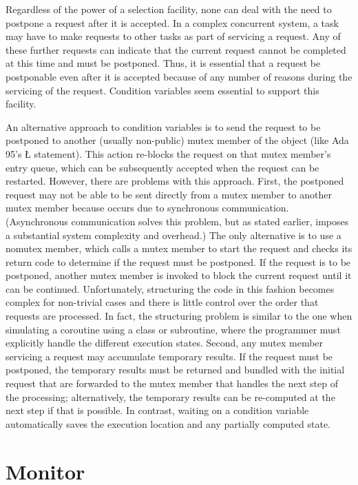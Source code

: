 \documentclass[openright,twoside]{report}
\begin{document}
Regardless of the power of a selection facility, none can deal with the need to postpone a request after it is accepted.
In a complex concurrent system, a task may have to make requests to other tasks as part of servicing a request.
Any of these further requests can indicate that the current request cannot be completed at this time and must be postponed.
Thus, it is essential that a request be postponable even after it is accepted because of any number of reasons during the servicing of the request.
Condition variables seem essential to support this facility.

An alternative approach to condition variables is to send the request to be postponed to another (usually non-public) mutex member of the object (like Ada 95's \LGinlinetrue\LGbegin\lgrinde\L{}\endlgrinde\LGend{} statement).
This action re-blocks the request on that mutex member's entry queue, which can be subsequently accepted when the request can be restarted.
However, there are problems with this approach.
First, the postponed request may not be able to be sent directly from a mutex member to another mutex member because  occurs due to synchronous communication.
(Asynchronous communication solves this problem, but as stated earlier, imposes a substantial system complexity and overhead.)
The only alternative is to use a nomutex member, which calls a mutex member to start the request and checks its return code to determine if the request must be postponed.
If the request is to be postponed, another mutex member is invoked to block the current request until it can be continued.
Unfortunately, structuring the code in this fashion becomes complex for non-trivial cases and there is little control over the order that requests are processed.
In fact, the structuring problem is similar to the one when simulating a coroutine using a class or subroutine, where the programmer must explicitly handle the different execution states.
Second, any mutex member servicing a request may accumulate temporary results.
If the request must be postponed, the temporary results must be returned and bundled with the initial request that are forwarded to the mutex member that handles the next step of the processing;
alternatively, the temporary results can be re-computed at the next step if that is possible.
In contrast, waiting on a condition variable automatically saves the execution location and any partially computed state.


\section{Monitor}
\label{s:Monitor}
\end{document}
